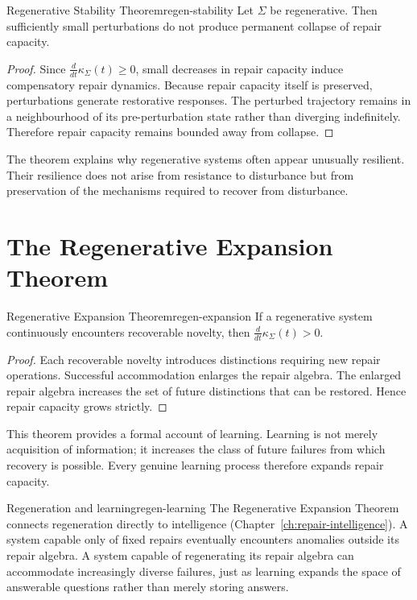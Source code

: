 \documentclass[12pt,twoside,openright]{book}
\begin{document}
\begin{theorem}{Regenerative Stability Theorem}{regen-stability}
  Let $\Sigma$ be regenerative. Then sufficiently small
  perturbations do not produce permanent collapse of repair
  capacity.
\end{theorem}

\begin{proof}
  Since $\frac{d}{dt}\kappa_\Sigma(t)\ge0$, small decreases
  in repair capacity induce compensatory repair dynamics.
  Because repair capacity itself is preserved, perturbations
  generate restorative responses. The perturbed trajectory
  remains in a neighbourhood of its pre-perturbation state
  rather than diverging indefinitely. Therefore repair
  capacity remains bounded away from collapse.
\end{proof}

The theorem explains why regenerative systems often appear
unusually resilient. Their resilience does not arise from
resistance to disturbance but from preservation of the
mechanisms required to recover from disturbance.

\section{The Regenerative Expansion Theorem}
\label{sec:ch11-expansion}

\begin{theorem}{Regenerative Expansion Theorem}{regen-expansion}
  If a regenerative system continuously encounters
  recoverable novelty, then
  $\frac{d}{dt}\kappa_\Sigma(t) > 0$.
\end{theorem}

\begin{proof}
  Each recoverable novelty introduces distinctions
  requiring new repair operations. Successful accommodation
  enlarges the repair algebra. The enlarged repair algebra
  increases the set of future distinctions that can be
  restored. Hence repair capacity grows strictly.
\end{proof}

This theorem provides a formal account of learning.
Learning is not merely acquisition of information; it
increases the class of future failures from which recovery
is possible. Every genuine learning process therefore
expands repair capacity.

\begin{remark}{Regeneration and learning}{regen-learning}
  The Regenerative Expansion Theorem connects regeneration
  directly to intelligence (Chapter~\ref{ch:repair-intelligence}).
  A system capable only of fixed repairs eventually
  encounters anomalies outside its repair algebra. A system
  capable of regenerating its repair algebra can accommodate
  increasingly diverse failures, just as learning expands
  the space of answerable questions rather than merely
  storing answers.
\end{remark}
\end{document}
